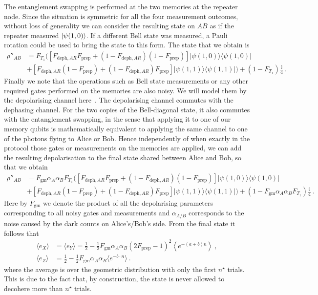 \documentclass[aps,pra,reprint,superscriptaddress]{revtex4-1}
\newcommand{\nstar}{n^{\star}}
\newcommand{\proj}[1]{|#1\rangle\langle#1|}
\begin{document}
The entanglement swapping is performed at the two memories at the repeater node. Since the situation is symmetric for all the four measurement outcomes, without loss of generality we can consider the resulting state on $AB$ as if the repeater measured $\ket{\psi(1,0)}$. If a different Bell state was measured, a Pauli rotation could be used to bring the state to this form. The state that we obtain is
\begin{align}
\rho''_{AB}		&= F_{T_1}\big(\left[F_{\textrm{deph},AR} F_{\textrm{prep}} + (1 - F_{\textrm{deph},AR})(1 - F_{\textrm{prep}}) \right] \proj{\psi(1,0)} \\
			& + \left[F_{\textrm{deph},AR}(1 - F_{\textrm{prep}}) + (1 - F_{\textrm{deph},AR}) F_{\textrm{prep}}\right] \proj{\psi(1,1)}\big) + \left(1- F_{T_1}\right) \frac{\mathbb{I}}{4}\ . \nonumber
\end{align}
Finally we note that the operations such as Bell state measurements or any other required gates performed on the memories are also noisy. We will model them by the depolarising channel here~\cite{cramer2015repeated}. The depolarising channel commutes with the dephasing channel. For the two copies of the Bell-diagonal state, it also commutes with the entanglement swapping, in the sense that applying it to one of our memory qubits is mathematically equivalent to applying the same channel to one of the photons flying to Alice or Bob. Hence independently of when exactly in the protocol those gates or measurements on the memories are applied, we can add the resulting depolarisation to the final state shared between Alice and Bob, so that we obtain
\begin{align}
\rho''_{AB}		&= F_{\textrm{gm}}\alpha_A \alpha_B F_{T_1}\big(\left[F_{\textrm{deph},AR} F_{\textrm{prep}} + (1 - F_{\textrm{deph},AR})(1 - F_{\textrm{prep}}) \right] \proj{\psi(1,0)} \\
			& + \left[F_{\textrm{deph},AR}(1 - F_{\textrm{prep}}) + (1 - F_{\textrm{deph},AR}) F_{\textrm{prep}}\right] \proj{\psi(1,1)}\big) + \left(1- F_{\textrm{gm}}\alpha_A \alpha_B F_{T_1}\right) \frac{\mathbb{I}}{4}\ . \nonumber
\end{align}
Here by $F_{\textrm{gm}}$ we denote the product of all the depolarising parameters corresponding to all noisy gates and measurements and $\alpha_{A/B}$ corresponds to the noise caused by the dark counts on Alice's/Bob's side.
From the final state it follows that
\begin{align}
\langle e_X\rangle	&= \langle e_Y\rangle =\frac{1}{2}-\frac{1}{2}F_{\mathrm{gm}}\alpha_A \alpha_B\left(2F_{\textrm{prep}}-1\right)^2\left\langle e^{-\left(a+b\right)n} \right\rangle\ ,\\
\langle e_Z\rangle	&= \frac{1}{2}-\frac{1}{2}F_{\mathrm{gm}}\alpha_A \alpha_B\langle e^{-b\cdot n}\rangle\ .
\end{align}
where the average is over the geometric distribution with only the first $\nstar$ trials. This is due to the fact that, by construction, the state is never allowed to decohere more than $\nstar$ trials. 
\end{document}
